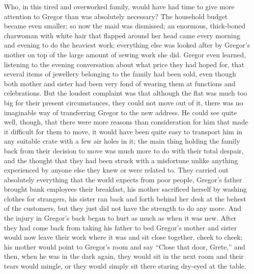 \documentclass[12pt]{report}
\begin{document}
Who, in this tired and overworked family, would have had time to give
more attention to Gregor than was absolutely necessary? The household
budget became even smaller; so now the maid was dismissed; an enormous,
thick-boned charwoman with white hair that flapped around her head came
every morning and evening to do the heaviest work; everything else was
looked after by Gregor's mother on top of the large amount of sewing
work she did. Gregor even learned, listening to the evening conversation
about what price they had hoped for, that several items of jewellery
belonging to the family had been sold, even though both mother and
sister had been very fond of wearing them at functions and celebrations.
But the loudest complaint was that although the flat was much too big
for their present circumstances, they could not move out of it, there
was no imaginable way of transferring Gregor to the new address. He
could see quite well, though, that there were more reasons than
consideration for him that made it difficult for them to move, it would
have been quite easy to transport him in any suitable crate with a few
air holes in it; the main thing holding the family back from their
decision to move was much more to do with their total despair, and the
thought that they had been struck with a misfortune unlike anything
experienced by anyone else they knew or were related to. They carried
out absolutely everything that the world expects from poor people,
Gregor's father brought bank employees their breakfast, his mother
sacrificed herself by washing clothes for strangers, his sister ran back
and forth behind her desk at the behest of the customers, but they just
did not have the strength to do any more. And the injury in Gregor's
back began to hurt as much as when it was new. After they had come back
from taking his father to bed Gregor's mother and sister would now leave
their work where it was and sit close together, cheek to cheek; his
mother would point to Gregor's room and say ``Close that door, Grete,''
and then, when he was in the dark again, they would sit in the next room
and their tears would mingle, or they would simply sit there staring
dry-eyed at the table.
\end{document}
